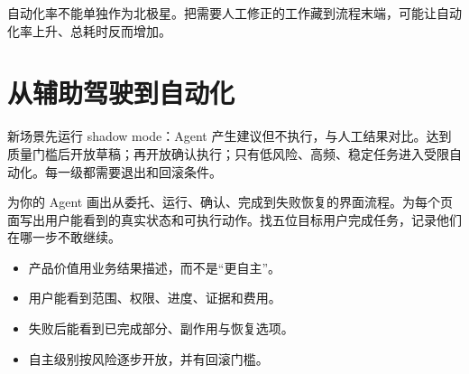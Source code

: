自动化率不能单独作为北极星。把需要人工修正的工作藏到流程末端，可能让自动化率上升、总耗时反而增加。

\section{从辅助驾驶到自动化}

新场景先运行 shadow mode：Agent 产生建议但不执行，与人工结果对比。达到质量门槛后开放草稿；再开放确认执行；只有低风险、高频、稳定任务进入受限自动化。每一级都需要退出和回滚条件。

\begin{practice}[画一个关键流程]
为你的 Agent 画出从委托、运行、确认、完成到失败恢复的界面流程。为每个页面写出用户能看到的真实状态和可执行动作。找五位目标用户完成任务，记录他们在哪一步不敢继续。
\end{practice}

\begin{checkpoint}
\begin{itemize}
  \item \checkbox 产品价值用业务结果描述，而不是“更自主”。
  \item \checkbox 用户能看到范围、权限、进度、证据和费用。
  \item \checkbox 失败后能看到已完成部分、副作用与恢复选项。
  \item \checkbox 自主级别按风险逐步开放，并有回滚门槛。
\end{itemize}
\end{checkpoint}

